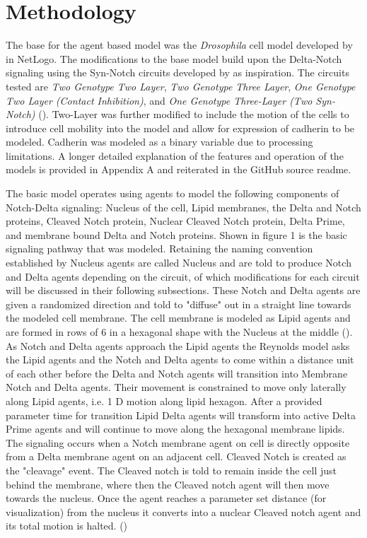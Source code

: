 \documentclass[12pt]{ifacconf}
\begin{document}




\section{Methodology}

The base for the agent based model was the \emph{Drosophila} cell model developed by \cite{RAB:19} in NetLogo. The modifications to the base model build upon the Delta-Notch signaling using the Syn-Notch circuits developed by \cite{TP:18} as inspiration. The circuits tested are \emph{Two Genotype Two Layer}, \emph{Two Genotype Three Layer}, \emph{One Genotype Two Layer  (Contact Inhibition)}, and \emph{One Genotype Three-Layer (Two Syn-Notch)} (\cite{TP:18}). Two-Layer was further modified to include the motion of the cells to introduce cell mobility into the model and allow for expression of cadherin to be modeled. Cadherin was modeled as a binary variable due to processing limitations. A longer detailed explanation of the features and operation of the models is provided in Appendix A and reiterated in the GitHub source readme. 

The basic model operates using agents to model the following components of Notch-Delta signaling: Nucleus of the cell, Lipid membranes, the Delta and Notch proteins, Cleaved Notch protein, Nuclear Cleaved Notch protein, Delta Prime, and membrane bound Delta and Notch proteins. Shown in figure 1 is the basic signaling pathway that was modeled. Retaining the naming convention established by \cite{RAB:19} Nucleus agents are called Nucleus and are told to produce Notch and Delta agents depending on the circuit, of which modifications for each circuit will be discussed in their following subsections. These Notch and Delta agents are given a randomized direction and told to "diffuse" out in a straight line towards the modeled cell membrane. The cell membrane is modeled as Lipid agents and are formed in rows of 6 in a hexagonal shape with the Nucleus at the middle (\cite{RAB:19}). As Notch and Delta agents approach the Lipid agents the Reynolds model asks the Lipid agents and the Notch and Delta agents to come within a distance unit of each other before the Delta and Notch agents will transition into Membrane Notch and Delta agents. Their movement is constrained to move only laterally along Lipid agents, i.e. 1 D motion along lipid hexagon. After a provided parameter time for transition Lipid Delta agents will transform into active Delta Prime agents and will continue to move along the hexagonal membrane lipids. The signaling occurs when a Notch membrane agent on cell is directly opposite from a Delta membrane agent on an adjacent cell. Cleaved Notch is created as the "cleavage" event. The Cleaved notch is told to remain inside the cell just behind the membrane, where then the Cleaved notch agent will then move towards the nucleus. Once the agent reaches a parameter set distance (for visualization) from the nucleus it converts into a nuclear Cleaved notch agent and its total motion is halted. (\cite{RAB:19})
\end{document}
